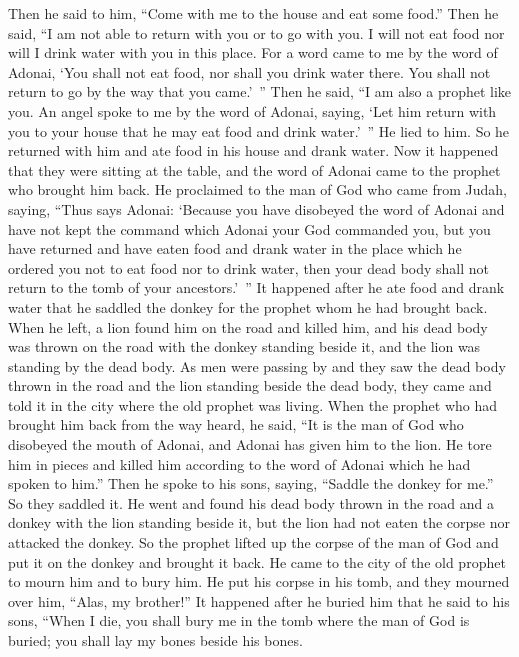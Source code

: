 \begin{biblechapter}
\verse Then he said to him, “Come with me to the house and eat some food.”
\verse Then he said, “I am not able to return with you or to go with you. I will not eat food nor will I drink water with you in this place.
\verse For a word came to me by the word of Adonai, ‘You shall not eat food, nor shall you drink water there. You shall not return to go by the way that you came.’ ”
\verse Then he said, “I am also a prophet like you. An angel spoke to me by the word of Adonai, saying, ‘Let him return with you to your house that he may eat food and drink water.’ ” He lied to him.
\verse So he returned with him and ate food in his house and drank water.
\verse Now it happened that they were sitting at the table, and the word of Adonai came to the prophet who brought him back.
\verse He proclaimed to the man of God who came from Judah, saying, “Thus says Adonai: ‘Because you have disobeyed the word of Adonai and have not kept the command which Adonai your God commanded you,
\verse but you have returned and have eaten food and drank water in the place which he ordered you not to eat food nor to drink water, then your dead body shall not return to the tomb of your ancestors.’ ”
 It happened after he ate food and drank water that he saddled the donkey for the prophet whom he had brought back.
\verse When he left, a lion found him on the road and killed him, and his dead body was thrown on the road with the donkey standing beside it, and the lion was standing by the dead body.
\verse As men were passing by and they saw the dead body thrown in the road and the lion standing beside the dead body, they came and told it in the city where the old prophet was living.
\verse When the prophet who had brought him back from the way heard, he said, “It is the man of God who disobeyed the mouth of Adonai, and Adonai has given him to the lion. He tore him in pieces and killed him according to the word of Adonai which he had spoken to him.”
\verse Then he spoke to his sons, saying, “Saddle the donkey for me.” So they saddled it.
\verse He went and found his dead body thrown in the road and a donkey with the lion standing beside it, but the lion had not eaten the corpse nor attacked the donkey.
\verse So the prophet lifted up the corpse of the man of God and put it on the donkey and brought it back. He came to the city of the old prophet to mourn him and to bury him.
\verse He put his corpse in his tomb, and they mourned over him, “Alas, my brother!”
\verse It happened after he buried him that he said to his sons, “When I die, you shall bury me in the tomb where the man of God is buried; you shall lay my bones beside his bones.

\end{biblechapter}
